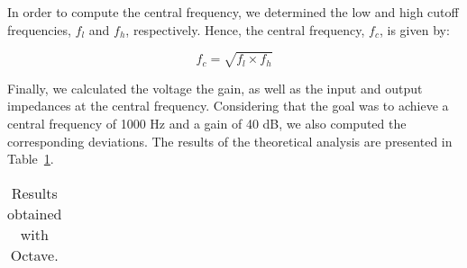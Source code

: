 \vspace{4mm}

In order to compute the central frequency, we determined the low and high cutoff frequencies, $f_l$ and $f_h$, respectively. Hence, the central frequency, $f_c$, is given by:

\begin{equation}
f_c=\sqrt{f_l\times f_h}
\end{equation}

Finally, we calculated the voltage the gain, as well as the input and output impedances at the central frequency. Considering that the goal was to achieve a central frequency of 1000 Hz and a gain of 40 dB, we also computed the corresponding deviations. The results of the theoretical analysis are presented in Table~\ref{tab:resultsteo}.

\begin{table}[H]
  \centering
  \begin{tabular}{|l|r|}
    \hline    
    
  \end{tabular}
  \caption{Results obtained with Octave.}
  \label{tab:resultsteo}
\end{table}

